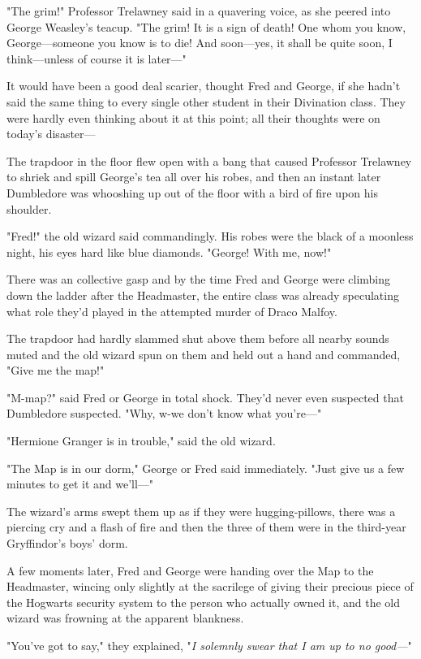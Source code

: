 "The grim!" Professor Trelawney said in a quavering voice, as she peered into
George Weasley's teacup. "The grim! It is a sign of death! One whom you know,
George---someone you know is to die! And soon---yes, it shall be quite soon, I
think---unless of course it is later---"

It would have been a good deal scarier, thought Fred and George, if she hadn't
said the same thing to every single other student in their Divination class.
They were hardly even thinking about it at this point; all their thoughts were
on today's disaster---

The trapdoor in the floor flew open with a bang that caused Professor Trelawney
to shriek and spill George's tea all over his robes, and then an instant later
Dumbledore was whooshing up out of the floor with a bird of fire upon his
shoulder.

"Fred!" the old wizard said commandingly. His robes were the black of a
moonless night, his eyes hard like blue diamonds. "George! With me, now!"

There was an collective gasp and by the time Fred and George were climbing down
the ladder after the Headmaster, the entire class was already speculating what
role they'd played in the attempted murder of Draco Malfoy.

The trapdoor had hardly slammed shut above them before all nearby sounds muted
and the old wizard spun on them and held out a hand and commanded, "Give me the
map!"

"M-map?" said Fred or George in total shock. They'd never even suspected that
Dumbledore suspected. "Why, w-we don't know what you're---"

"Hermione Granger is in trouble," said the old wizard.

"The Map is in our dorm," George or Fred said immediately. "Just give us a few
minutes to get it and we'll---"

The wizard's arms swept them up as if they were hugging-pillows, there was a
piercing cry and a flash of fire and then the three of them were in the
third-year Gryffindor's boys' dorm.

A few moments later, Fred and George were handing over the Map to the
Headmaster, wincing only slightly at the sacrilege of giving their precious
piece of the Hogwarts security system to the person who actually owned it, and
the old wizard was frowning at the apparent blankness.

"You've got to say," they explained, "\emph{I solemnly swear that I am up to no
good---}"


